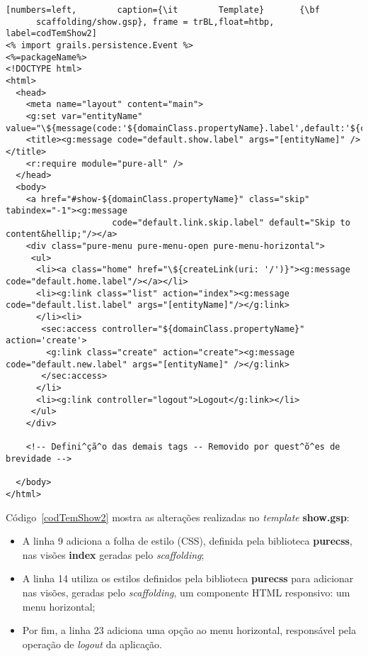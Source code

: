 \begin{lstlisting}[numbers=left,        caption={\it        Template}       {\bf
      scaffolding/show.gsp}, frame = trBL,float=htbp, label=codTemShow2] 
<% import grails.persistence.Event %>
<%=packageName%>
<!DOCTYPE html>
<html>
  <head>
    <meta name="layout" content="main">
    <g:set var="entityName" value="\${message(code:'${domainClass.propertyName}.label',default:'${className}')}"/>
    <title><g:message code="default.show.label" args="[entityName]" /></title>
    <r:require module="pure-all" />
  </head>
  <body>
    <a href="#show-${domainClass.propertyName}" class="skip" tabindex="-1"><g:message 
                     code="default.link.skip.label" default="Skip to content&hellip;"/></a>
    <div class="pure-menu pure-menu-open pure-menu-horizontal">
     <ul>
      <li><a class="home" href="\${createLink(uri: '/')}"><g:message code="default.home.label"/></a></li>
      <li><g:link class="list" action="index"><g:message code="default.list.label" args="[entityName]"/></g:link>
      </li><li>
       <sec:access controller="${domainClass.propertyName}" action='create'>
        <g:link class="create" action="create"><g:message code="default.new.label" args="[entityName]" /></g:link>
       </sec:access>
      </li>
      <li><g:link controller="logout">Logout</g:link></li>
     </ul>
    </div>

    <!-- Defini^çã^o das demais tags -- Removido por quest^õ^es de brevidade -->    

  </body>
</html>
\end{lstlisting}

\noindent  Código~\ref{codTemShow2}  mostra as  alterações realizadas  no {\it
  template} {\bf show.gsp}: 

\begin{itemize}

\vspace{0.5cm}

\item A linha 9 adiciona a  folha de estilo (CSS), definida pela biblioteca {\bf
  purecss}, nas visões {\bf index} geradas pelo {\it scaffolding}; 

\vspace{0.5cm}

\item A linha 14 utiliza os estilos definidos pela biblioteca {\bf purecss} para
  adicionar  nas visões,  geradas  pelo {\it  scaffolding},  um componente  HTML
  responsivo: um menu horizontal; 

\vspace{0.5cm} 

\item Por  fim, a linha  23 adiciona uma  opção ao menu  horizontal, responsável
  pela operação de {\it logout} da aplicação.  

\end{itemize}

